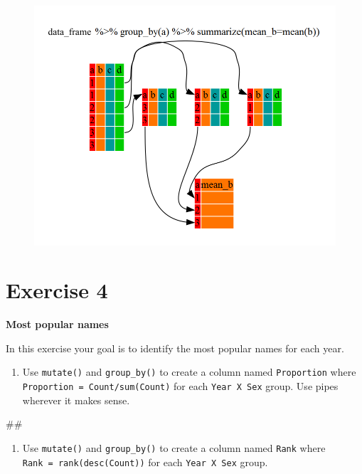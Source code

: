 \documentclass[]{book}
\newenvironment{Shaded}{\begin{snugshade}}{\end{snugshade}}
\newcommand{\NormalTok}[1]{#1}
\providecommand{\tightlist}{%
  \setlength{\itemsep}{0pt}\setlength{\parskip}{0pt}}
\begin{document}
\begin{figure}
\centering
\includegraphics{R/Rintro/images/split-apply-combine.png}
\caption{}
\end{figure}

\section{Exercise 4}\label{exercise-4}

\textbf{Most popular names}

In this exercise your goal is to identify the most popular names for
each year.

\begin{enumerate}
\def\labelenumi{\arabic{enumi}.}
\tightlist
\item
  Use \texttt{mutate()} and \texttt{group\_by()} to create a column
  named \texttt{Proportion} where
  \texttt{Proportion\ =\ Count/sum(Count)} for each
  \texttt{Year\ X\ Sex} group. Use pipes wherever it makes sense.
\end{enumerate}

\begin{Shaded}
\begin{Highlighting}[]
\NormalTok{## }
\end{Highlighting}
\end{Shaded}

\begin{enumerate}
\def\labelenumi{\arabic{enumi}.}
\setcounter{enumi}{1}
\tightlist
\item
  Use \texttt{mutate()} and \texttt{group\_by()} to create a column
  named \texttt{Rank} where \texttt{Rank\ =\ rank(desc(Count))} for each
  \texttt{Year\ X\ Sex} group.
\end{enumerate}
\end{document}
